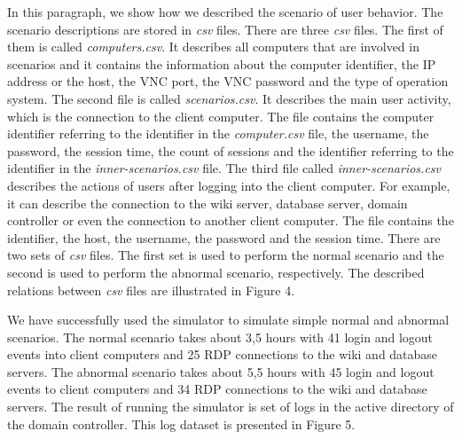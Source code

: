 


In this paragraph, we show how we described the scenario of user behavior. The scenario descriptions are stored in \textit{csv} files. There are three \textit{csv} files. The first of them is called \textit{computers.csv}. It describes all computers that are involved in scenarios and it contains the information about the computer identifier, the IP address or the host, the VNC port, the VNC password and the type of operation system.
The second file is called \textit{scenarios.csv}. It describes the main user activity, which is the connection to the client computer. The file contains the computer identifier referring to the identifier in the \textit{computer.csv} file, the username, the password, the session time, the count of sessions and the identifier referring to the identifier in the \textit{inner-scenarios.csv} file. The third file called \textit{inner-scenarios.csv} describes the actions of users after logging into the client computer. For example, it can describe the connection to the wiki server, database server, domain controller or even the connection to another client computer. The file contains the identifier, the host, the username, the password and the session time. There are two sets of \textit{csv} files. The first set is used to perform the normal scenario and the second is used to perform the abnormal scenario, respectively. The described relations between \textit{csv} files are illustrated in Figure 4.
 	
 	
We have successfully used the simulator to simulate simple normal and abnormal scenarios. The normal scenario takes about 3,5 hours with 41 login and logout events into client computers and 25 RDP connections to the wiki and database servers. The abnormal scenario takes about 5,5 hours with 45 login and logout events to client computers and 34 RDP connections to the wiki and database servers. The result of running the simulator is set of logs in the active directory of the domain controller. This log dataset is presented in Figure 5. 


 
% 
